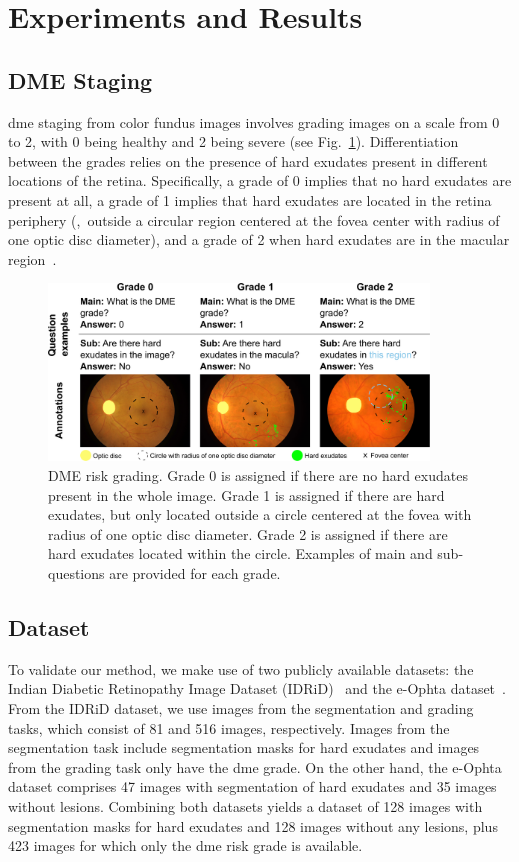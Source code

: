 \section{Experiments and Results}

\subsection{DME Staging}
\gls{dme} staging from color fundus images involves grading images on a scale from 0 to 2, with 0 being healthy and 2 being severe (see Fig.~\ref{fig:dme}). Differentiation between the grades relies on the presence of hard exudates present in different locations of the retina. Specifically, a grade of 0 implies that no hard exudates are present at all, a grade of 1 implies that hard exudates are located in the retina periphery (\ie,~outside a circular region centered at the fovea center with radius of one optic disc diameter), and a grade of 2 when hard exudates are in the macular region~\cite{ren2018diabetic}.
\begin{figure}[b!]
\begin{center}
\includegraphics[width=0.9\textwidth]{Figures/Part2_Consist/01_mainsub/dme_2.pdf}
\caption{DME risk grading. Grade 0 is assigned if there are no hard exudates present in the whole image. Grade 1 is assigned if there are hard exudates, but only located outside a circle centered at the fovea with radius of one optic disc diameter. Grade 2 is assigned if there are hard exudates located within the circle. Examples of main and sub-questions are provided for each grade.}
\label{fig:dme}
\end{center}
\end{figure}

\subsection{Dataset}
To validate our method, we make use of two publicly available datasets: the Indian Diabetic Retinopathy Image Dataset (IDRiD)~\cite{idrid} and the e-Ophta dataset~\cite{decenciere2013teleophta}. From the IDRiD dataset, we use images from the segmentation and grading tasks, which consist of 81 and 516 images, respectively. Images from the segmentation task include segmentation masks for hard exudates and images from the grading task only have the \gls{dme} grade. On the other hand, the e-Ophta dataset comprises 47 images with segmentation of hard exudates and 35 images without lesions. Combining both datasets yields a dataset of 128 images with segmentation masks for hard exudates and 128 images without any lesions, plus 423 images for which only the \gls{dme} risk grade is available. 

